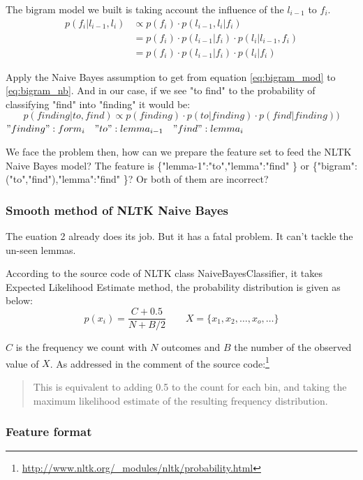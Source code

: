 \documentclass[a4paper]{article}
\begin{document}
The bigram model we built is taking account the influence of the $l_{i-1}$ to $f_i$.
\begin{align}
p(f_i|l_{i-1},l_i) &\propto p(f_i) \cdot  p(l_{i-1},l_i|f_i)  \\
&= p(f_i) \cdot  p(l_{i-1}|f_i) \cdot p( l_i | l_{i-1},f_i) \label{eq:bigram_mod} \\
&= p(f_i) \cdot  p(l_{i-1}|f_i) \cdot p( l_i | f_i) \label{eq:bigram_nb}
\end{align}

Apply the Naive Bayes assumption to get from equation \ref{eq:bigram_mod} to \ref{eq:bigram_nb}. And in our case, if we see "to find" to the probability of classifying "find" into "finding"   it would be:
\begin{equation}
p(finding | to,find) \propto p(finding)\cdot p(to | finding) \cdot  p(find | finding))
\end{equation}
$"finding":form_i \quad "to":lemma_{i-1} \quad "find":lemma_i$


We face the problem then, how can we prepare the feature set to feed the NLTK Naive Bayes model? The feature is \{"lemma-1":"to","lemma":"find" \} or 
 \{"bigram":("to","find"),"lemma":"find" \}? Or both of them are incorrect? 
\subsubsection{Smooth method of NLTK Naive Bayes}
The euation 2 already does its job. But it has a fatal problem. It can't tackle the un-seen lemmas. 

According to the source code of NLTK class NaiveBayesClassifier, it takes Expected Likelihood Estimate method, the probability distribution is given as below:
\begin{equation}
p(x_i)=\frac{C+0.5}{N+B/2} \qquad X = \{x_1,x_2,\dots,x_o,\dots\}
\end{equation}

$C$ is the frequency we count with $N$ outcomes and $B$ the number of the observed value of $X$. As addressed in the comment of the source code:\footnote{\url{http://www.nltk.org/_modules/nltk/probability.html}}
\begin{quotation}
This is equivalent to adding 0.5 to the count for each bin, and taking the maximum likelihood estimate of the resulting frequency distribution.
\end{quotation}


\subsubsection{Feature format}
\end{document}
